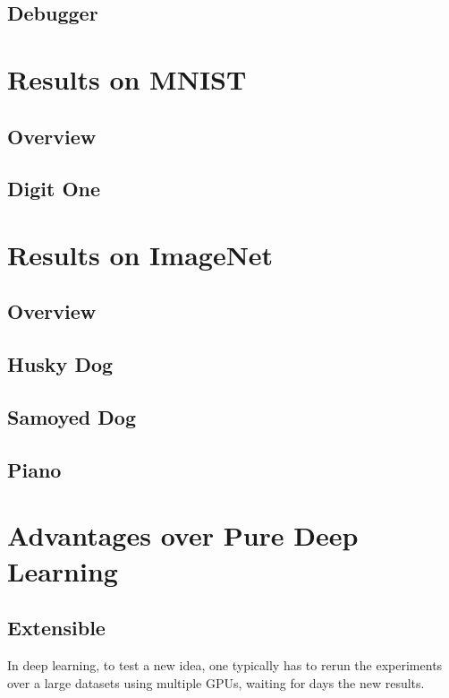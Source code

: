 \documentclass[11pt]{article} 	%
\theoremstyle{definition}
\begin{document}
\subsection{Debugger}


\section{Results on MNIST}

\subsection{Overview}

\subsection{Digit One}


\section{Results on ImageNet}

\subsection{Overview}

\subsection{Husky Dog}

\subsection{Samoyed Dog}

\subsection{Piano}

\section{Advantages over Pure Deep Learning}

\subsection{Extensible}

In deep learning, to test a new idea, one typically has to rerun the experiments over a large datasets using multiple GPUs, waiting for days the new results.
\end{document}
